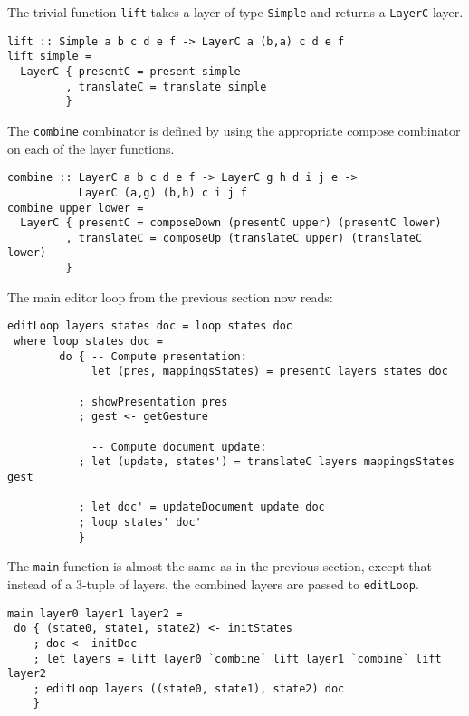 \par The trivial function \texttt{lift} takes a layer of type \texttt{Simple}
      and returns a \texttt{LayerC} layer.\begin{small}\begin{verbatim}lift :: Simple a b c d e f -> LayerC a (b,a) c d e f
lift simple = 
  LayerC { presentC = present simple
         , translateC = translate simple
         }\end{verbatim}\end{small}

\par The \texttt{combine} combinator is defined by using the appropriate
      compose combinator on each of the layer functions. \begin{small}\begin{verbatim}combine :: LayerC a b c d e f -> LayerC g h d i j e -> 
           LayerC (a,g) (b,h) c i j f
combine upper lower =
  LayerC { presentC = composeDown (presentC upper) (presentC lower)
         , translateC = composeUp (translateC upper) (translateC lower)
         }\end{verbatim}\end{small}

\par {} The main editor loop from the
      previous section now reads:\begin{small}\begin{verbatim}editLoop layers states doc = loop states doc
 where loop states doc = 
        do { -- Compute presentation:
             let (pres, mappingsStates) = presentC layers states doc
           
           ; showPresentation pres
           ; gest <- getGesture
 
             -- Compute document update:
           ; let (update, states') = translateC layers mappingsStates gest
       
           ; let doc' = updateDocument update doc
           ; loop states' doc'
           }\end{verbatim}\end{small}

\par The \texttt{main} function is almost the same as in the previous
      section, except that instead of a 3-tuple of layers, the combined layers are
      passed to \texttt{editLoop}. \begin{small}\begin{verbatim}main layer0 layer1 layer2 = 
 do { (state0, state1, state2) <- initStates
    ; doc <- initDoc 
    ; let layers = lift layer0 `combine` lift layer1 `combine` lift  layer2
    ; editLoop layers ((state0, state1), state2) doc
    }\end{verbatim}\end{small}

